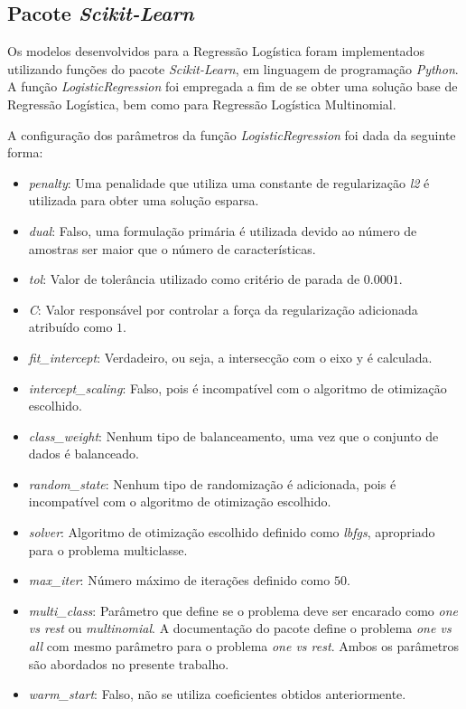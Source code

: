 \documentclass[conference]{IEEEtran}
\begin{document}
\subsection{Pacote \textit{Scikit-Learn}} \label{sec:pac}

Os modelos desenvolvidos para a Regressão Logística foram implementados utilizando funções do pacote \emph{Scikit-Learn}, em linguagem de programação \emph{Python}. A função \emph{LogisticRegression} foi empregada a fim de se obter uma solução base de Regressão Logística, bem como para Regressão Logística Multinomial.

A configuração dos parâmetros da função \emph{LogisticRegression} foi dada da seguinte forma:
\begin{itemize}
	\footnotesize \item \textit{penalty}: Uma penalidade que utiliza uma constante de regularização \footnotesize \textit{l2} é utilizada para obter uma solução esparsa.
	\footnotesize \item \textit{dual}: Falso, uma formulação primária é utilizada devido ao número de amostras ser maior que o número de características.
	\footnotesize \item \textit{tol}: Valor de tolerância utilizado como critério de parada de $0.0001$.
	\footnotesize \item \textit{C}: Valor responsável por controlar a força da regularização adicionada atribuído como $1$.
	\footnotesize \item \textit{fit\_intercept}: Verdadeiro, ou seja, a intersecção com o eixo y é calculada.
	\footnotesize \item \textit{intercept\_scaling}: Falso, pois é incompatível com o algoritmo de otimização escolhido.
	\footnotesize \item \textit{class\_weight}: Nenhum tipo de balanceamento, uma vez que o conjunto de dados é balanceado.
	\footnotesize \item \textit{random\_state}: Nenhum tipo de randomização é adicionada, pois é incompatível com o algoritmo de otimização escolhido.
	\footnotesize \item \textit{solver}: Algoritmo de otimização escolhido definido como \textit{lbfgs}, apropriado para o problema multiclasse.
	\footnotesize \item \textit{max\_iter}: Número máximo de iterações definido como $50$.
	\footnotesize \item \textit{multi\_class}: Parâmetro que define se o problema deve ser encarado como \textit{one vs rest} ou \textit{multinomial}. A documentação do pacote define o problema \textit{one vs all} com mesmo parâmetro para o problema \textit{one vs rest}. Ambos os parâmetros são abordados no presente trabalho. 
	\footnotesize \item \textit{warm\_start}: Falso, não se utiliza coeficientes obtidos anteriormente.
\end{itemize}
\end{document}
